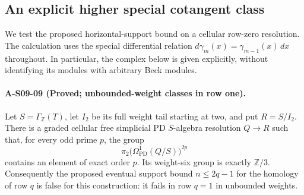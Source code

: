 \subsection{An explicit higher special cotangent class}

We test the proposed horizontal-support bound on a cellular row-zero
resolution.  The calculation uses the special differential relation
$d\gamma_m(x)=\gamma_{m-1}(x)\,dx$ throughout.  In particular, the
complex below is given explicitly, without identifying its modules
with arbitrary Beck modules.

\paragraph{A-S09-09 (Proved; unbounded-weight classes in row one).}
Let $S=\Gamma_{\mathbb Z}(T)$, let $I_2$ be its full weight tail
starting at two, and put $R=S/I_2$.  There is a graded cellular free
simplicial PD $S$-algebra resolution $Q\to R$ such that, for every
odd prime $p$, the group
\[
 \pi_2\bigl(\Omega^1_{\mathrm{PD}}(Q/S)\bigr)^{2p}
\]
contains an element of exact order $p$.  Its weight-six group is
exactly $\mathbb Z/3$.  Consequently the proposed eventual support
bound $n\leq 2q-1$ for the homology of row $q$ is false for this
construction: it fails in row $q=1$ in unbounded weights.

